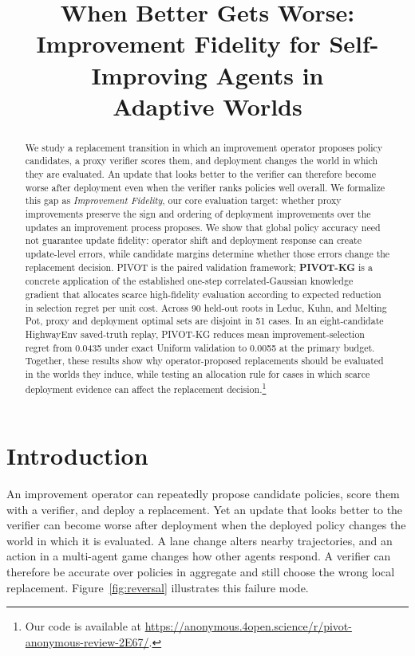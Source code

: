 \documentclass{article}
\title{When Better Gets Worse:\\
Improvement Fidelity for Self-Improving Agents in\\
Adaptive Worlds}
\author{}
\date{}
\begin{document}
\maketitle

\begin{abstract}
We study a replacement transition in which an improvement operator proposes
policy candidates, a proxy verifier scores them, and deployment changes the
world in which they are evaluated. An update that looks better to the verifier
can therefore become worse after deployment even when the verifier ranks
policies well overall.
We formalize this gap as \emph{Improvement Fidelity}, our core evaluation
target: whether proxy improvements preserve the sign and ordering of deployment
improvements over the updates an improvement process proposes. We show that
global policy accuracy need not guarantee update fidelity: operator shift and
deployment response can create update-level errors, while candidate margins
determine whether those errors change the replacement decision. PIVOT is the
paired validation framework; \textbf{PIVOT-KG} is a concrete application of
the established one-step correlated-Gaussian knowledge gradient that allocates
scarce high-fidelity evaluation according to expected reduction in selection
regret per unit cost. Across 90 held-out roots in Leduc, Kuhn, and Melting Pot,
proxy and deployment optimal sets are disjoint in 51 cases. In an
eight-candidate HighwayEnv saved-truth replay, PIVOT-KG reduces mean
improvement-selection regret from 0.0435 under exact Uniform validation
to 0.0055 at the primary budget. Together, these results show why
operator-proposed replacements should be evaluated in the worlds they induce,
while testing an allocation rule for cases in which scarce deployment evidence
can affect the replacement decision.\footnote{Our code is available at \url{https://anonymous.4open.science/r/pivot-anonymous-review-2E67/}.}
\end{abstract}


\section{Introduction}

An improvement operator can repeatedly propose candidate policies, score them
with a verifier, and deploy a replacement. Yet an update that looks better to the
verifier can become worse after deployment when the deployed policy changes the
world in which it is evaluated. A lane change alters nearby trajectories, and
an action in a multi-agent game changes how other agents respond. A verifier
can therefore be accurate over policies in aggregate and still choose the wrong
local replacement. Figure~\ref{fig:reversal} illustrates this failure mode.
\end{document}
